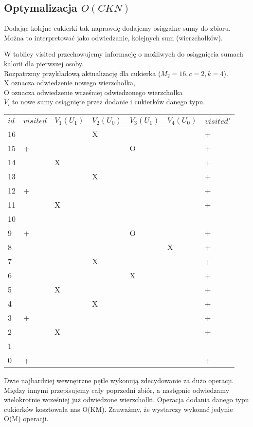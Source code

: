 \documentclass[paper=a4, fontsize=11pt]{article}
\begin{document}
\subsection{Optymalizacja $O(CKN)$}
\begin{observation} Dodając kolejne cukierki tak naprawdę dodajemy osiągalne sumy do zbioru. Można to interpretować jako odwiedzanie, kolejnych sum (wierzchołków).
\end{observation}

W tablicy visited przechowujemy informację o możliwych do osiągnięcia sumach kalorii dla pierwszej osoby. \\
Rozpatrzmy przykładową aktualizację dla cukierka ($M_2 = 16, c=2, k=4$). \\
X oznacza odwiedzenie nowego wierzchołka, \\
O oznacza odwiedzenie wcześniej odwiedzonego wierzchołka \\
$V_i$ to nowe sumy osiągnięte przez dodanie i cukierków danego typu.
\begin{center}
    \begin{tabular}{| l | l | l | l | l | l | p{2cm} |}
    \hline
    $id$ & $visited$ & $V_1(U_1)$ & $V_2(U_0)$ & $V_3(U_1)$ & $V_4(U_0)$ & $visited'$ \\
    \hline
    16 & & & X & & &+ \\
    15 &+& & &O & &+ \\
    14 & &X & & & &+ \\
    13 & & &X & & &+ \\
    12 &+& & & & &+ \\
    11 & &X & & & &+ \\
    10 & & & & & & \\
    9 &+& & &O & &+ \\
    8 & & & & & X &+ \\
    7 & & &X & & &+ \\
    6 & & & &X & &+ \\
    5 & &X & & & &+ \\
    4 & & &X & & &+ \\
    3 &+& & & & &+ \\
    2 & &X & & & &+ \\
    1 & & & & & & \\
    0 &+ & & & & &+ \\
    \hline
    \end{tabular}
\end{center}

\begin{observation} Dwie najbardziej wewnętrzne pętle wykonują zdecydowanie za dużo operacji. Między innymi przepisujemy cały poprzedni zbiór, a następnie odwiedzamy wielokrotnie wcześniej już odwiedzone wierzchołki. Operacja dodania danego typu cukierków kosztowała nas O(KM). Zauważmy, że wystarczy wykonać jedynie O(M) operacji.
\end{observation}
\end{document}
